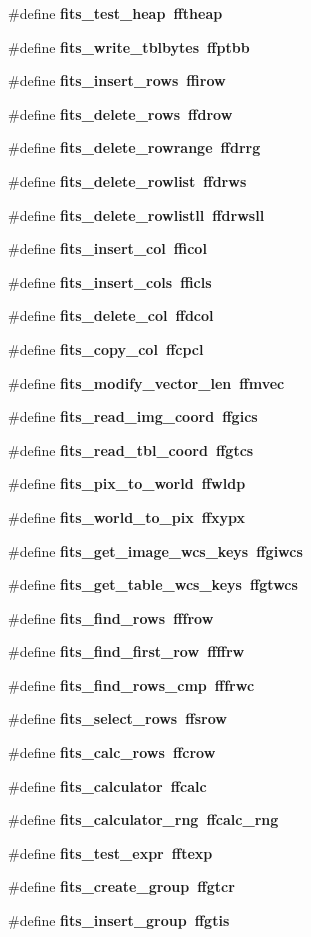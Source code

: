 \begin{CompactItemize}
\#define \bf{fits\_\-test\_\-heap}~fftheap
\item 
\#define \bf{fits\_\-write\_\-tblbytes}~ffptbb
\item 
\#define \bf{fits\_\-insert\_\-rows}~ffirow
\item 
\#define \bf{fits\_\-delete\_\-rows}~ffdrow
\item 
\#define \bf{fits\_\-delete\_\-rowrange}~ffdrrg
\item 
\#define \bf{fits\_\-delete\_\-rowlist}~ffdrws
\item 
\#define \bf{fits\_\-delete\_\-rowlistll}~ffdrwsll
\item 
\#define \bf{fits\_\-insert\_\-col}~fficol
\item 
\#define \bf{fits\_\-insert\_\-cols}~fficls
\item 
\#define \bf{fits\_\-delete\_\-col}~ffdcol
\item 
\#define \bf{fits\_\-copy\_\-col}~ffcpcl
\item 
\#define \bf{fits\_\-modify\_\-vector\_\-len}~ffmvec
\item 
\#define \bf{fits\_\-read\_\-img\_\-coord}~ffgics
\item 
\#define \bf{fits\_\-read\_\-tbl\_\-coord}~ffgtcs
\item 
\#define \bf{fits\_\-pix\_\-to\_\-world}~ffwldp
\item 
\#define \bf{fits\_\-world\_\-to\_\-pix}~ffxypx
\item 
\#define \bf{fits\_\-get\_\-image\_\-wcs\_\-keys}~ffgiwcs
\item 
\#define \bf{fits\_\-get\_\-table\_\-wcs\_\-keys}~ffgtwcs
\item 
\#define \bf{fits\_\-find\_\-rows}~fffrow
\item 
\#define \bf{fits\_\-find\_\-first\_\-row}~ffffrw
\item 
\#define \bf{fits\_\-find\_\-rows\_\-cmp}~fffrwc
\item 
\#define \bf{fits\_\-select\_\-rows}~ffsrow
\item 
\#define \bf{fits\_\-calc\_\-rows}~ffcrow
\item 
\#define \bf{fits\_\-calculator}~ffcalc
\item 
\#define \bf{fits\_\-calculator\_\-rng}~ffcalc\_\-rng
\item 
\#define \bf{fits\_\-test\_\-expr}~fftexp
\item 
\#define \bf{fits\_\-create\_\-group}~ffgtcr
\item 
\#define \bf{fits\_\-insert\_\-group}~ffgtis
\item 

\end{CompactItemize}
